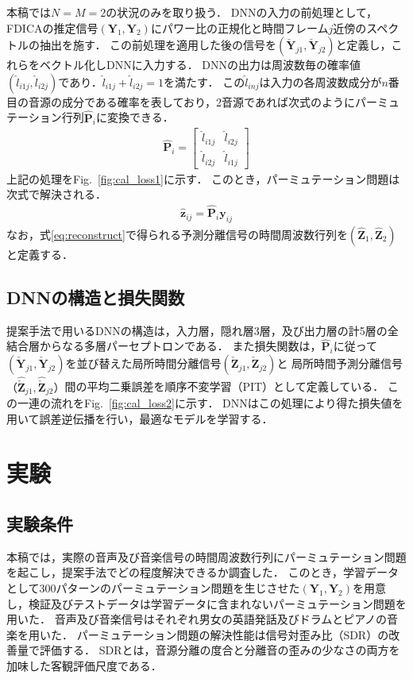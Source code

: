 \documentclass[a4j]{jsarticle}
\begin{document}
本稿では$N=M=2$の状況のみを取り扱う．
DNNの入力の前処理として，FDICAの推定信号$(\bm{Y}_1, \bm{Y}_2)$にパワー比の正規化\cite{Permutation_solverBSS}と時間フレーム$j$近傍のスペクトルの抽出を施す．
この前処理を適用した後の信号を$(\check{\bm{Y}}_{j1}, \check{\bm{Y}}_{j2})$と定義し，これらをベクトル化しDNNに入力する．
DNNの出力は周波数毎の確率値$(\hat{l}_{i1j}, \hat{l}_{i2j})$であり．$\hat{l}_{i1j}+\hat{l}_{i2j}=1$を満たす．
この$\hat{l}_{inj}$は入力の各周波数成分が$n$番目の音源の成分である確率を表しており，2音源であれば次式のようにパーミュテーション行列$\hat{\bm{P}}_i$に変換できる．
\begin{align}
  \hat{\bm{P}}_i = 
  \begin{bmatrix}
    \hat{l}_{i1j} & \hat{l}_{i2j} \\
    \hat{l}_{i2j} & \hat{l}_{i1j}
  \end{bmatrix} \label{eq:permMat}
\end{align}
上記の処理をFig.~\ref{fig:cal_loss1}に示す．
このとき，パーミュテーション問題は次式で解決される．
\begin{align}
  \hat{\bm{z}}_{ij} = \hat{\bm{P}}_i \bm{y}_{ij} \label{eq:reconstruct}
\end{align}
なお，式\eqref{eq:reconstruct}で得られる予測分離信号の時間周波数行列を$(\hat{\bm{Z}}_1, \hat{\bm{Z}}_2)$と定義する．
\subsection{DNNの構造と損失関数}
提案手法で用いるDNNの構造は，入力層，隠れ層3層，及び出力層の計5層の全結合層からなる多層パーセプトロンである．
また損失関数は，$\hat{\bm{P}}_i$に従って$(\check{\bm{Y}}_{j1}, \check{\bm{Y}}_{j2})$を並び替えた局所時間分離信号$(\check{\bm{Z}}_{j1}, \check{\bm{Z}}_{j2})$と
局所時間予測分離信号$（\widehat{\check{\bm{Z}}}_{j1}, \widehat{\check{\bm{Z}}}_{j2}）$間の平均二乗誤差を順序不変学習（PIT）\cite{PIT}として定義している．
この一連の流れをFig.~\ref{fig:cal_loss2}に示す．
DNNはこの処理により得た損失値を用いて誤差逆伝播を行い，最適なモデルを学習する．
\section{実験}

\subsection{実験条件}
本稿では，実際の音声及び音楽信号の時間周波数行列にパーミュテーション問題を起こし，提案手法でどの程度解決できるか調査した．
このとき，学習データとして300パターンのパーミュテーション問題を生じさせた$(\bm{Y}_1, \bm{Y}_2)$を用意し，検証及びテストデータは学習データに含まれないパーミュテーション問題を用いた．
音声及び音楽信号はそれぞれ男女の英語発話及びドラムとピアノの音楽を用いた．
パーミュテーション問題の解決性能は信号対歪み比（SDR）の改善量で評価する．
SDRとは，音源分離の度合と分離音の歪みの少なさの両方を加味した客観評価尺度である．
\end{document}
